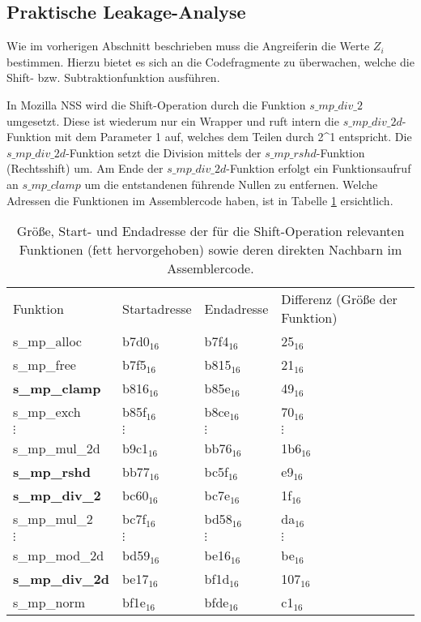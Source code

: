 \subsection{Praktische Leakage-Analyse}

Wie im vorherigen Abschnitt beschrieben muss die Angreiferin die Werte $Z_i$ bestimmen.
Hierzu bietet es sich an die Codefragmente zu überwachen, welche die Shift- bzw. Subtraktionfunktion ausführen.

In Mozilla NSS wird die Shift-Operation durch die Funktion $s\_mp\_div\_2$ umgesetzt.
Diese ist wiederum nur ein Wrapper und ruft intern die $s\_mp\_div\_2d$-Funktion mit dem Parameter 1 auf, welches dem Teilen durch 2^1 entspricht.
Die $s\_mp\_div\_2d$-Funktion setzt die Division mittels der $s\_mp\_rshd$-Funktion (Rechtsshift) um. 
Am Ende der $s\_mp\_div\_2d$-Funktion erfolgt ein Funktionsaufruf an $s\_mp\_clamp$ um die entstandenen führende Nullen zu entfernen.
Welche Adressen die Funktionen im Assemblercode haben, ist in Tabelle \ref{tbl:assOffsetShift} ersichtlich. 

\begin{table}[h]
\label{tbl:assOffsetShift}
\caption{Größe, Start- und Endadresse der für die Shift-Operation relevanten Funktionen (fett hervorgehoben) sowie deren direkten Nachbarn im Assemblercode.}
\begin{tabular}{llll}
Funktion       & Startadresse & Endadresse & Differenz (Größe der Funktion) \\
s\_mp\_alloc   & b7d0$_{16}$        & b7f4$_{16}$      & 25$_{16}$   \\
s\_mp\_free    & b7f5$_{16}$        & b815$_{16}$      & 21$_{16}$   \\
\textbf{s\_mp\_clamp}   & b816$_{16}$        & b85e$_{16}$      & 49$_{16}$   \\
s\_mp\_exch    & b85f$_{16}$        & b8ce$_{16}$      & 70$_{16}$   \\
$\vdots$               &  $\vdots$             &    $\vdots$         &     $\vdots$   \\
s\_mp\_mul\_2d & b9c1$_{16}$        & bb76$_{16}$      & 1b6$_{16}$   \\
\textbf{s\_mp\_rshd}    & bb77$_{16}$        & bc5f$_{16}$      & e9$_{16}$   \\
\textbf{s\_mp\_div\_2}  & bc60$_{16}$        & bc7e$_{16}$      & 1f$_{16}$   \\
s\_mp\_mul\_2  & bc7f$_{16}$        & bd58$_{16}$      & da$_{16}$   \\
$\vdots$               &  $\vdots$             &    $\vdots$         &     $\vdots$   \\
s\_mp\_mod\_2d & bd59$_{16}$        & be16$_{16}$      & be$_{16}$   \\
\textbf{s\_mp\_div\_2d} & be17$_{16}$        & bf1d$_{16}$      & 107$_{16}$  \\
s\_mp\_norm    & bf1e$_{16}$        & bfde$_{16}$      & c1$_{16}$  
\end{tabular}
\end{table}


